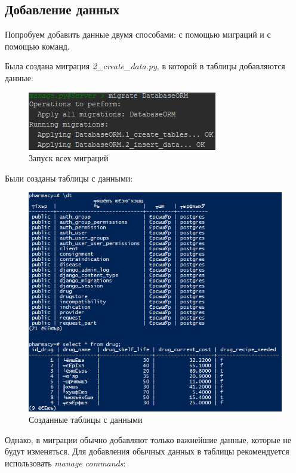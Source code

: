 \documentclass[14pt,a4paper,report]{report}
\begin{document}
\subsection{Добавление данных}

Попробуем добавить данные двумя способами: с помощью миграций и с помощью команд. 

Была создана миграция \emph{2\_create\_data.py}, в которой в таблицы добавляются данные:

\begin{figure}[h!]
	\centering
	\includegraphics[scale = 0.95]{images/7.png}
	\caption{Запуск всех миграций}
	\label{image:7}
\end{figure}

Были созданы таблицы с данными:

\begin{figure}[h!]
	\centering
	\includegraphics[scale = 0.80]{images/8.png}
	\caption{Созданные таблицы с данными}
	\label{image:8}
\end{figure}

Однако, в миграции обычно добавляют только важнейшие данные, которые не будут изменяться. Для добавления обычных данных в таблицы рекомендуется использовать \emph{manage commands}:
\end{document}
